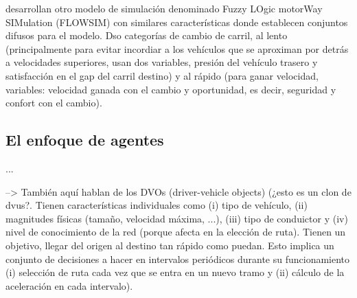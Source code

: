 \cite{McDonald1997, Wu2003} desarrollan otro modelo de simulación denominado Fuzzy LOgic motorWay SIMulation (FLOWSIM) con similares características donde establecen conjuntos difusos para el modelo. Dso categorías de cambio de carril, al lento (principalmente para evitar incordiar a los vehículos que se aproximan por detrás a velocidades superiores, usan dos variables, presión del vehículo trasero y satisfacción en el gap del carril destino) y al rápido (para ganar velocidad, variables: velocidad ganada con el cambio y oportunidad, es decir, seguridad y confort con el cambio).



\subsection{El enfoque de agentes}

...

\cite{Hidas2002} --> También aquí hablan de los DVOs (driver-vehicle objects) (¿esto es un clon de \glspl{dvu}?. Tienen características individuales como (i) tipo de vehículo, (ii) magnitudes físicas (tamaño, velocidad máxima, ...), (iii) tipo de conduictor y (iv) nivel de conocimiento de la red (porque afecta en la elección de ruta). Tienen un objetivo, llegar del origen al destino tan rápido como puedan. Esto implica un conjunto de decisiones a hacer en intervalos periódicos durante su funcionamiento (i) selección de ruta cada vez que se entra en un nuevo tramo y (ii) cálculo de la aceleración en cada intervalo).

